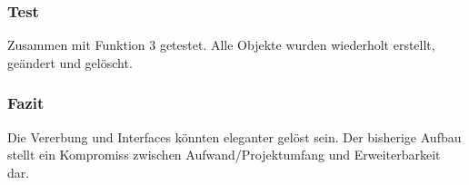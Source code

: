 \subsubsection{Test}
Zusammen mit Funktion 3 getestet. Alle Objekte wurden wiederholt erstellt, geändert und gelöscht. 

\subsubsection{Fazit}
Die Vererbung und Interfaces könnten eleganter gelöst sein. Der bisherige Aufbau stellt ein Kompromiss zwischen Aufwand/Projektumfang und Erweiterbarkeit dar.